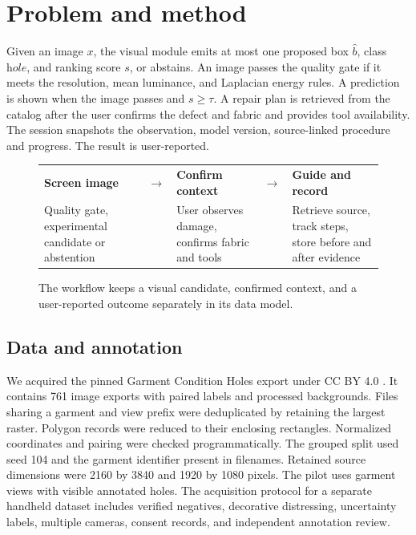 \section{Problem and method}

Given an image $x$, the visual module emits at most one proposed box $\hat b$, class $\textit{hole}$, and ranking score $s$, or abstains. An image passes the quality gate if it meets the resolution, mean luminance, and Laplacian energy rules. A prediction is shown when the image passes and $s \geq \tau$. A repair plan is retrieved from the catalog after the user confirms the defect and fabric and provides tool availability. The session snapshots the observation, model version, source-linked procedure and progress. The result is user-reported.

\begin{figure}[htbp]
  \centering
  \begin{tabular}{@{}p{.26\linewidth} p{.05\linewidth} p{.25\linewidth} p{.05\linewidth} p{.27\linewidth}@{}}
    \textbf{Screen image} & $\to$ & \textbf{Confirm context} & $\to$ & \textbf{Guide and record} \\
    \raggedright Quality gate, experimental candidate or abstention && \raggedright User observes damage, confirms fabric and tools && \raggedright Retrieve source, track steps, store before and after evidence
  \end{tabular}
  \caption{The workflow keeps a visual candidate, confirmed context, and a user-reported outcome separately in its data model.}
  \label{fig:workflow}
\end{figure}

\subsection{Data and annotation}

We acquired the pinned Garment Condition Holes export under CC BY 4.0 \cite{cisutac}. It contains 761 image exports with paired labels and processed backgrounds. Files sharing a garment and view prefix were deduplicated by retaining the largest raster. Polygon records were reduced to their enclosing rectangles. Normalized coordinates and pairing were checked programmatically. The grouped split used seed 104 and the garment identifier present in filenames. Retained source dimensions were 2160 by 3840 and 1920 by 1080 pixels. The pilot uses garment views with visible annotated holes. The acquisition protocol for a separate handheld dataset includes verified negatives, decorative distressing, uncertainty labels, multiple cameras, consent records, and independent annotation review.

